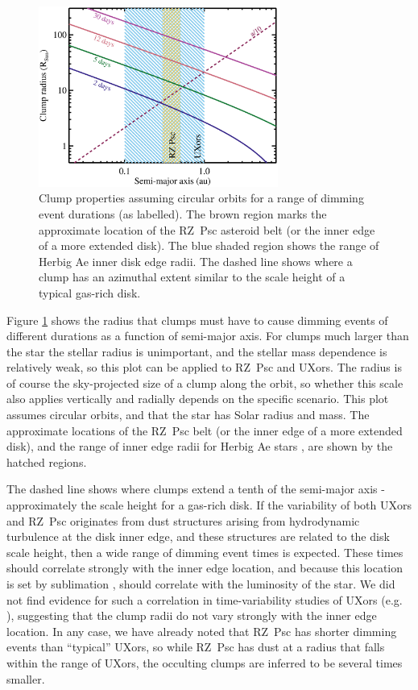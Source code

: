 \documentclass[]{rsos}
\begin{document}
\begin{figure}
  \begin{center}
    \hspace{-0.5cm} \includegraphics[width=0.7\textwidth]{figs/rcl-a.eps}
    \caption{Clump properties assuming circular orbits for a range of dimming event
      durations (as labelled). The brown region marks the approximate location of the
      RZ~Psc asteroid belt (or the inner edge of a more extended disk). The blue shaded
      region shows the range of Herbig Ae inner disk edge radii. The dashed line shows
      where a clump has an azimuthal extent similar to the scale height of a typical
      gas-rich disk.}\label{fig:rcla}
  \end{center}
\end{figure}

Figure \ref{fig:rcla} shows the radius that clumps must have to cause dimming events of
different durations as a function of semi-major axis. For clumps much larger than the
star the stellar radius is unimportant, and the stellar mass dependence is relatively
weak, so this plot can be applied to RZ~Psc and UXors. The radius is of course the
sky-projected size of a clump along the orbit, so whether this scale also applies
vertically and radially depends on the specific scenario. This plot assumes circular
orbits, and that the star has Solar radius and mass. The approximate locations of the
RZ~Psc belt (or the inner edge of a more extended disk), and the range of inner edge
radii for Herbig Ae stars \cite{2007prpl.conf..539M}, are shown by the hatched regions.

The dashed line shows where clumps extend a tenth of the semi-major axis - approximately
the scale height for a gas-rich disk. If the variability of both UXors and RZ~Psc
originates from dust structures arising from hydrodynamic turbulence at the disk inner
edge, and these structures are related to the disk scale height, then a wide range of
dimming event times is expected. These times should correlate strongly with the inner
edge location, and because this location is set by sublimation
\cite{2007prpl.conf..539M}, should correlate with the luminosity of the star. We did not
find evidence for such a correlation in time-variability studies of UXors
(e.g. \cite{1991A&AS...89..319B}), suggesting that the clump radii do not vary strongly
with the inner edge location. In any case, we have already noted that RZ~Psc has shorter
dimming events than ``typical'' UXors, so while RZ~Psc has dust at a radius that falls
within the range of UXors, the occulting clumps are inferred to be several times smaller.
\end{document}
